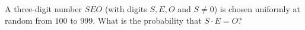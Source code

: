 A three-digit number $\overline{SEO}$ (with digits $S,E,O$ and $S\ne0$) is chosen uniformly at random from $100$ to $999$. What is the probability that $S\cdot E=O$?
